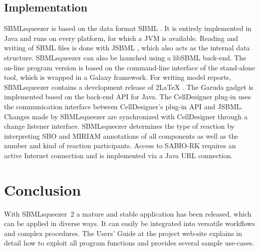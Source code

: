 \documentclass{bioinfo}
\newcommand{\SBMLLaTeX}{{\sffamily\upshape\raisebox{-.35ex}{S\hspace{-.425ex}BML}\hspace{-0.5ex}2\LaTeX}}
\begin{document}
\vspace{-.3cm}
\begin{methods}
\section{Implementation}
SBMLsqueezer is based on the data format SBML \citep{Hucka2004}.
It is entirely implemented in Java\texttrademark{} and runs on every platform, for which a JVM is available.
Reading and writing of SBML files is done with JSBML \citep{Draeger2011b}, which also acts as the internal data structure.
SBMLsqueezer can also be launched using a libSBML \citep{Bornstein2008} back-end.
The on-line program version is based on the command-line interface of the stand-alone tool, which is wrapped in a Galaxy \citep{Goecks2010} framework.
For writing model reports, SBMLsqueezer contains a development release of \SBMLLaTeX{} \citep{Draeger2009a}.
The Garuda gadget \citep{Ghosh2011} is implemented based on the back-end API for Java\texttrademark.
The CellDesigner plug-in uses the communication interface between CellDesigner's plug-in API and JSBML.
Changes made by SBMLsqueezer are synchronized with CellDesigner through a change listener interface.
SBMLsqueezer determines the type of reaction by interpreting SBO and MIRIAM annotations \citep{Courtot2011} of all components as well as the number and kind of reaction participants.
Access to SABIO-RK \citep{Wittig2012} requires an active Internet connection and is implemented via a Java\texttrademark{} URL connection.
\end{methods}

%
%
\section{Conclusion}

With SBMLsqueezer~2 a mature and stable application has been released, which can be applied in diverse ways.
It can easily be integrated into versatile workflows and complex procedures.
The Users' Guide at the project web-site
explains in detail
how to exploit all program functions 
and provides several sample use-cases.
\end{document}
